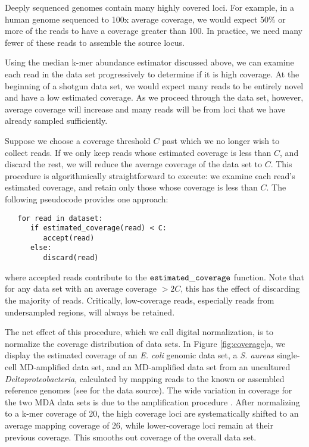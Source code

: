 \documentclass[10pt]{article}
\begin{document}
Deeply sequenced genomes contain many highly covered loci.  For
example, in a human genome sequenced to 100x average coverage, we would
expect 50\% or more of the reads to have a coverage greater than 100.
In practice, we need many fewer of these reads to assemble
the source locus.

Using the median k-mer abundance estimator discussed above, we can examine each read
in the data set progressively to determine if it is high coverage.  At
the beginning of a shotgun data set, we would expect many reads to be
entirely novel and have a low estimated coverage.  As we proceed
through the data set, however, average coverage will increase and many
reads will be from loci that we have already sampled sufficiently.

Suppose we choose a coverage threshold $C$ past which we no longer
wish to collect reads. If we only keep reads whose estimated coverage
is less than $C$, and discard the rest, we will reduce the average
coverage of the data set to $C$.  This procedure is
algorithmically straightforward to execute: we examine each read's
estimated coverage, and retain only those whose coverage is less than $C$.
The following pseudocode provides one approach:
\begin{verbatim}
   for read in dataset:
      if estimated_coverage(read) < C:
         accept(read)
      else:
         discard(read)
\end{verbatim}
\noindent
where accepted reads contribute to the $\tt estimated\_coverage$
function.  Note that for any data set with an average coverage $> 2C$,
this has the effect of discarding the majority of reads.  Critically,
low-coverage reads, especially reads from undersampled regions, will
always be retained.

The net effect of this procedure, which we call digital normalization,
is to normalize the coverage distribution of data sets.  In Figure
\ref{fig:coverage}a, we display the estimated coverage of an {\em
  E. coli} genomic data set, a {\em S. aureus} single-cell
MD-amplified data set, and an MD-amplified data set from an uncultured
{\em Deltaproteobacteria}, calculated by mapping reads to the known or
assembled reference genomes (see \cite{pubmed21926975} for the data
source).  The wide variation in coverage for the two MDA data sets is
due to the amplification procedure \cite{pubmed17487184}.  After
normalizing to a k-mer coverage of 20, the high coverage loci are
systematically shifted to an average mapping coverage of 26, while
lower-coverage loci remain at their previous coverage.  This smooths
out coverage of the overall data set.
\end{document}
